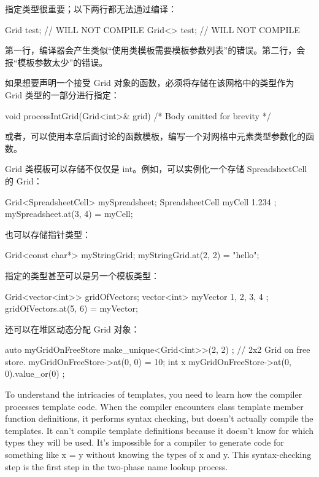 指定类型很重要；以下两行都无法通过编译：

\begin{cpp}
Grid test; // WILL NOT COMPILE
Grid<> test; // WILL NOT COMPILE
\end{cpp}

第一行，编译器会产生类似“使用类模板需要模板参数列表”的错误。第二行，会报“模板参数太少”的错误。

如果想要声明一个接受 Grid 对象的函数，必须将存储在该网格中的类型作为 Grid 类型的一部分进行指定：

\begin{cpp}
void processIntGrid(Grid<int>& grid) { /* Body omitted for brevity */ }
\end{cpp}

或者，可以使用本章后面讨论的函数模板，编写一个对网格中元素类型参数化的函数。

Grid 类模板可以存储不仅仅是 int。例如，可以实例化一个存储 SpreadsheetCell 的 Grid：

\begin{cpp}
Grid<SpreadsheetCell> mySpreadsheet;
SpreadsheetCell myCell { 1.234 };
mySpreadsheet.at(3, 4) = myCell;
\end{cpp}

也可以存储指针类型：

\begin{cpp}
Grid<const char*> myStringGrid;
myStringGrid.at(2, 2) = "hello";
\end{cpp}

指定的类型甚至可以是另一个模板类型：

\begin{cpp}
Grid<vector<int>> gridOfVectors;
vector<int> myVector { 1, 2, 3, 4 };
gridOfVectors.at(5, 6) = myVector;
\end{cpp}

还可以在堆区动态分配 Grid 对象：

\begin{cpp}
auto myGridOnFreeStore { make_unique<Grid<int>>(2, 2) }; // 2x2 Grid on free store.
myGridOnFreeStore->at(0, 0) = 10;
int x { myGridOnFreeStore->at(0, 0).value_or(0) };
\end{cpp}



To understand the intricacies of templates, you need to learn how the compiler processes template code. When the compiler encounters class template member function definitions, it performs syntax checking, but doesn’t actually compile the templates. It can’t compile template definitions because it doesn’t know for which types they will be used. It’s impossible for a compiler to generate code for something like x = y without knowing the types of x and y. This syntax-checking step is the first step in the two-phase name lookup process.

